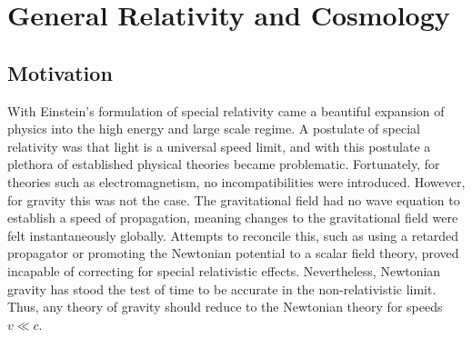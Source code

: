 \chapter{General Relativity and Cosmology}
\section{Motivation}
With Einstein's formulation of special relativity came a beautiful expansion of physics into the high energy and large scale regime. A postulate of special relativity was that light is a universal speed limit, and with this postulate a plethora of established physical theories became problematic. Fortunately, for theories such as electromagnetism, no incompatibilities were introduced. However, for gravity this was not the case. The gravitational field had no wave equation to establish a speed of propagation, meaning changes to the gravitational field were felt instantaneously globally. Attempts to reconcile this, such as using a retarded propagator or promoting the Newtonian potential to a scalar field theory, proved incapable of correcting for special relativistic effects. Nevertheless, Newtonian gravity has stood the test of time to be accurate in the non-relativistic limit. Thus, any theory of gravity should reduce to the Newtonian theory for speeds $v \ll c$.

